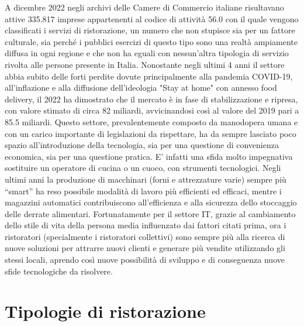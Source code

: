 \documentclass[a4paper, titlepage, 12pt, openright, twoside]{book}
\begin{document}
A dicembre 2022 negli archivi delle Camere di Commercio italiane risultavano attive 335.817 
imprese appartenenti al codice di attività 56.0 con il quale vengono classificati i servizi di ristorazione,
un numero che non stupisce sia per un fattore culturale, sia perché i pubblici esercizi di questo tipo sono
una realtà ampiamente diffusa in ogni regione e che non ha eguali con nessun'altra tipologia di servizio rivolta alle persone presente in Italia.
\newline
Nonostante negli ultimi 4 anni il settore abbia subito delle forti perdite dovute principalmente alla pandemia COVID-19,
all'inflazione e alla diffusione dell'ideologia "Stay at home" con annesso food delivery, 
il 2022 ha dimostrato che il mercato è in fase di stabilizzazione e ripresa, con valore stimato di circa 82 miliardi,
avvicinandosi così al valore del 2019 pari a 85.5 miliardi. \cite{rristorazione}
\newline
Questo settore, prevalentemente composto da manodopera umana e con un carico importante di legislazioni da rispettare, ha da sempre lasciato poco spazio all’introduzione della tecnologia, sia per una questione di convenienza economica, sia per una questione pratica. E’ infatti una sfida molto impegnativa sostituire un operatore di cucina o un cuoco, con strumenti tecnologici. Negli ultimi anni la produzione di macchinari (forni e attrezzature varie) sempre più “smart” ha reso possibile modalità di lavoro più efficienti ed efficaci, mentre i magazzini automatici contribuiscono all'efficienza e alla sicurezza dello stoccaggio delle derrate alimentari.
\newline
Fortunatamente per il settore IT, grazie al cambiamento dello stile di vita della persona media influenzato dai fattori citati prima,
ora i ristoratori (specialmente i ristoratori collettivi) sono sempre più alla ricerca di nuove soluzioni per attrarre nuovi clienti
e generare più vendite utilizzando gli stessi locali, aprendo così nuove possibilità di sviluppo e di conseguenza nuove sfide tecnologiche da risolvere.

\section{Tipologie di ristorazione}
\end{document}

